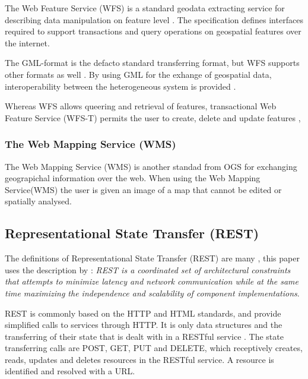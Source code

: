 The Web Feature Service (WFS) is a standard geodata extracting service for describing data manipulation on feature level \citep{Peng2005, Norgedigitalt2014}. The specification defines interfaces required to support transactions and query operations on geospatial features over the internet.

The GML-format is the defacto standard transferring format, but WFS supports other formats as well \citep{Eggan2017}. By using GML for the exhange of geospatial data,  interoperability between the heterogeneous system is provided \citep{YaoXiaobai2008Iimo}.

Whereas WFS allows queering and retrieval of features, transactional Web Feature Service (WFS-T) permits the user to create, delete and update features \citep{OGCNetwork},

\subsubsection{The Web Mapping Service (WMS)}
The Web Mapping Service (WMS) is another standad from OGS for exchanging geograpichal information over the web. When using the Web Mapping Service(WMS) the user is given an image of a map that cannot be edited or spatially analysed. 	


\subsection{Representational State Transfer (REST)}
The definitions of Representational State Transfer (REST) are many \citep{Fielding, Richardson}, this paper uses the description by \cite{Fieldinga}: \textit{REST is a coordinated set of architectural constraints that attempts to minimize latency and network communication while at the same time maximizing the independence and scalability of component implementations}. 

REST is commonly based on the HTTP and HTML standards, and provide simplified calls to services through HTTP. It is only data structures and the transferring of their state that is dealt with in a RESTful service \cite{Battle2008}. The state transferring calls are POST, GET, PUT and DELETE, which receptively creates, reads, updates and deletes resources in the RESTful service. A resource is identified and resolved with a URL.



